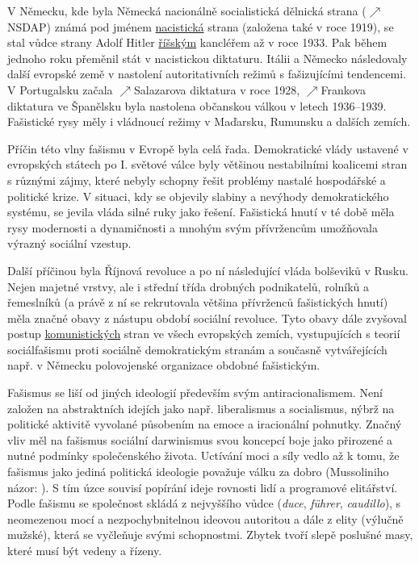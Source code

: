 \documentclass{article}
\begin{document}
  V Německu, kde byla Německá nacionálně socialistická dělnická strana ($\nearrow$NSDAP) známá pod jménem \hyperref[sec:nacismus]{nacistická} strana (založena také v roce 1919), se stal vůdce strany Adolf Hitler \hyperref[sec:rise]{říšským} kancléřem až v roce 1933. Pak během jednoho roku přeměnil stát v nacistickou diktaturu. Itálii a Německo následovaly další evropské země v nastolení autoritativních režimů s fašizujícími tendencemi. V Portugalsku začala $\nearrow$Salazarova diktatura v roce 1928, $\nearrow$Frankova diktatura ve Španělsku byla nastolena občanskou válkou v letech 1936--1939. Fašistické rysy měly i vládnoucí režimy v Maďarsku, Rumunsku a dalších zemích.

  Příčin této vlny fašismu v Evropě byla celá řada. Demokratické vlády ustavené v evropských státech po I. světové válce byly většinou nestabilními koalicemi stran s různými zájmy, které nebyly schopny řešit problémy nastalé hospodářské a politické krize. V situaci, kdy se objevily slabiny a nevýhody demokratického systému, se jevila vláda silné ruky jako řešení. Fašistická hnutí v té době měla rysy modernosti a dynamičnosti a mnohým svým přívržencům umožňovala výrazný sociální vzestup.

  Další příčinou byla Říjnová revoluce a po ní následující vláda bolševiků v Rusku. Nejen majetné vrstvy, ale i střední třída drobných podnikatelů, rolníků a řemeslníků (a právě z ní se rekrutovala většina přívrženců fašistických hnutí) měla značné obavy z nástupu období sociální revoluce. Tyto obavy dále zvyšoval postup \hyperref[sec:komunismus]{komunistických} stran ve všech evropských zemích, vystupujících s teorií sociálfašismu proti sociálně demokratickým stranám a současně vytvářejících např. v Německu polovojenské organizace obdobné fašistickým.

  Fašismus se liší od jiných ideologií především svým antiracionalismem. Není založen na abstraktních idejích jako např. liberalismus a socialismus, nýbrž na politické aktivitě vyvolané působením na emoce a iracionální pohnutky. Značný vliv měl na fašismus sociální darwinismus svou koncepcí boje jako přirozené a nutné podmínky společenského života. Uctívání moci a síly vedlo až k tomu, že fašismus jako jediná politická ideologie považuje válku za dobro (Mussoliniho názor: ). S tím úzce souvisí popírání ideje rovnosti lidí a programové elitářství. Podle fašismu se společnost skládá z nejvyššího vůdce ({\it duce}, {\it führer}, {\it caudillo}), s neomezenou mocí a nezpochybnitelnou ideovou autoritou a dále z elity (výlučně mužské), která se vyčleňuje svými schopnostmi. Zbytek tvoří slepě poslušné masy, které musí být vedeny a řízeny.
\end{document}
